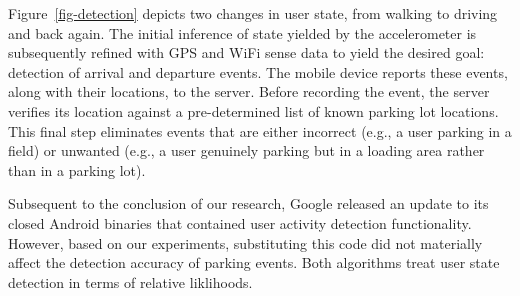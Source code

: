 Figure~\ref{fig-detection} depicts two changes in user state, from walking to
driving and back again.  The initial inference of state yielded by the
accelerometer is subsequently refined with GPS and WiFi sense data to
yield the desired goal:  detection of arrival and departure events.  The mobile
device reports these events, along with their locations, to the server.  Before
recording the event, the server verifies its location against a pre-determined
list of known parking lot locations.  This final step eliminates events that
are either incorrect (e.g., a user parking in a field) or unwanted (e.g., a
user genuinely parking but in a loading area rather than in a parking lot).

Subsequent to the conclusion of our research, Google released an update to its
closed Android binaries that contained user activity detection functionality.
However, based on our experiments, substituting this
code did not materially affect the detection accuracy of parking 
events.  Both algorithms treat user state detection in terms of relative
liklihoods.~\cite{recognition-confidence}  

